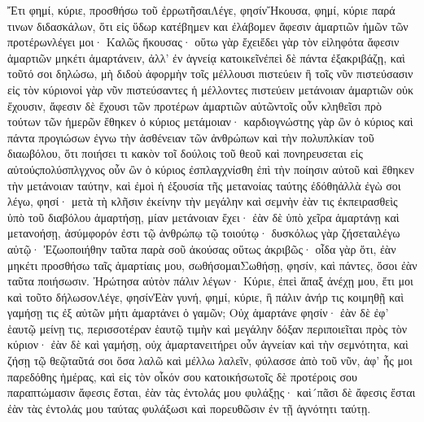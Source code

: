 Ἔτι φημί, κύριε, προσθήσω τοῦ ἐρρωτῆσαιΛέγε, φησίνἬκουσα, φημί, κύριε παρά τινων διδασκάλων, ὅτι εἰς ὕδωρ κατέβημεν και ἐλάβομεν ἄφεσιν ἁμαρτιῶν ἡμῶν τῶν προτέρωνλέγει μοι· Καλῶς ἤκουσας· οὕτω γὰρ ἔχειἔδει γὰρ τὸν εἰληφότα ἄφεσιν ἁμαρτιῶν μηκέτι ἁμαρτάνειν, ἀλλ’ ἐν ἁγνείᾳ κατοικεῖνἐπεὶ δὲ πάντα ἐξακριβάζῃ, καὶ τοῦτό σοι δηλώσω, μὴ διδοὺ ἀφορμὴν τοῖς μέλλουσι πιστεύειν ἢ τοῖς νῦν πιστεύσασιν εἰς τὸν κύριονοἱ γὰρ νῦν πιστεύσαντες ἡ μέλλοντες πιστεύειν μετάνοιαν ἁμαρτιῶν οὐκ ἔχουσιν, ἄφεσιν δὲ ἔχουσι τῶν προτέρων ἁμαρτιῶν αὐτῶντοῖς οὖν κληθεῖσι πρὸ τούτων τῶν ἡμερῶν ἔθηκεν ὁ κύριος μετάμοιαν· καρδιογνώστης γὰρ ὢν ὁ κύριος καὶ πάντα προγιώσων ἐγνω τὴν ἀσθένειαν τῶν ἀνθρώπων καὶ τὴν πολυπλκίαν τοῦ διαωβόλου, ὅτι ποιήσει τι κακὸν τοῖ δούλοις τοῦ θεοῦ καὶ πονηρευσεται εἰς αὐτούςπολύσπλγχνος οὖν ὢν ὁ κύριος ἐσπλαγχνίσθη ἐπὶ τὴν ποίησιν αὐτοῦ καὶ ἔθηκεν τὴν μετάνοιαν ταύτην, καὶ ἐμοὶ ἡ ἐξουσία τῆς μετανοίας ταύτης ἐδόθηἀλλὰ ἐγὼ σοι λέγω, φησί· μετὰ τὴ κλῆσιν ἐκείνην τὴν μεγάλην καὶ σεμνὴν ἐὰν τις ἐκπειρασθεὶς ὑπὸ τοῦ διαβόλου ἁμαρτήσῃ, μίαν μετάνοιαν ἔχει· ἐὰν δὲ ὑπὸ χεῖρα ἁμαρτάνῃ καὶ μετανοήσῃ, ἀσύμφορόν ἐστι τῷ ἀνθρώπῳ τῷ τοιούτῳ· δυσκόλως γὰρ ζήσεταιλέγω αὐτῷ· Ἐζωοποιήθην ταῦτα παρὰ σοῦ ἀκούσας οὕτως ἀκριβῶς· οἶδα γὰρ ὅτι, ἐὰν μηκέτι προσθήσω ταῖς ἁμαρτίαις μου, σωθήσομαιΣωθήσῃ, φησίν, καὶ πάντες, ὅσοι ἐὰν ταῦτα ποιήσωσιν.
Ἠρώτησα αὐτὸν πάλιν λέγων· Κύριε, ἐπεὶ ἅπαξ ἀνέχῃ μου, ἔτι μοι καὶ τοῦτο δήλωσονΛέγε, φησίνἘὰν γυνή, φημί, κύριε, ἢ πάλιν ἀνήρ τις κοιμηθῇ καὶ γαμήσῃ τις ἐξ αὐτῶν μήτι ἁμαρτάνει ὁ γαμῶν; Οὐχ ἁμαρτάνε φησίν· ἐὰν δὲ ἐφ’ ἑαυτῷ μείνῃ τις, περισσοτέραν ἑαυτῷ τιμὴν καὶ μεγάλην δόξαν περιποιεῖται πρὸς τὸν κύριον· ἐὰν δὲ καὶ γαμήσῃ, οὐχ ἁμαρτανειτήρει οὖν ἁγνείαν καὶ τὴν σεμνότητα, καὶ ζήσῃ τῷ θεῷταῦτά σοι ὅσα λαλῶ καὶ μέλλω λαλεῖν, φύλασσε ἀπὸ τοῦ νῦν, ἀφ’ ἧς μοι παρεδόθης ἡμέρας, καὶ εἰς τὸν οἶκόν σου κατοικήσωτοῖς δὲ προτέροις σου παραπτώμασιν ἄφεσις ἔσται, ἐὰν τὰς ἐντολάς μου φυλάξῃς· καὶ´πᾶσι δὲ ἄφεσις ἔσται ἐὰν τὰς ἐντολάς μου ταύτας φυλάξωσι καὶ πορευθῶσιν ἐν τῇ ἁγνότητι ταύτῃ.

